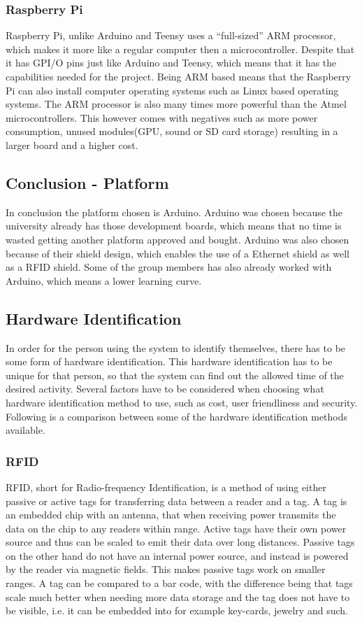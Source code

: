 \subsubsection{Raspberry Pi}
Raspberry Pi, unlike Arduino and Teensy uses a ``full-sized'' ARM processor, which makes it more like a regular computer then a microcontroller. Despite that it has GPI/O pins just like Arduino and Teensy, which means that it has the capabilities needed for the project. Being ARM based means that the Raspberry Pi can also install computer operating systems such as Linux based operating systems. The ARM processor is also many times more powerful than the Atmel microcontrollers. This however comes with negatives such as more power consumption, unused modules(GPU, sound or SD card storage) resulting in a larger board and a higher cost. 

\subsection{Conclusion - Platform}
In conclusion the platform chosen is Arduino. Arduino was chosen because the university already has those development boards, which means that no time is wasted getting another platform approved and bought. Arduino was also chosen because of their shield design, which enables the use of a Ethernet shield as well as a RFID shield. Some of the group members has also already worked with Arduino, which means a lower learning curve.

\subsection{Hardware Identification}
In order for the person using the system to identify themselves, there has to be some form of hardware identification. This hardware identification has to be unique for that person, so that the system can find out the allowed time of the desired activity. Several factors have to be considered when choosing what hardware identification method to use, such as cost, user friendliness and security. Following is a comparison between some of the hardware identification methods available.

\subsubsection{RFID}
RFID, short for Radio-frequency Identification, is a method of using either passive or active tags for transferring data between a reader and a tag. A tag is an embedded chip with an antenna, that when receiving power transmits the data on the chip to any readers within range. Active tags have their own power source and thus can be scaled to emit their data over long distances. Passive tags on the other hand do not have an internal power source, and instead is powered by the reader via magnetic fields. This makes passive tags work on smaller ranges. A tag can be compared to a bar code, with the difference being that tags scale much better when needing more data storage and the tag does not have to be visible, i.e. it can be embedded into for example key-cards, jewelry and such.

